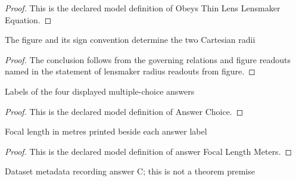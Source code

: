 \begin{proof}
  This is the declared model definition of Obeys Thin Lens Lensmaker Equation.
\end{proof}
\begin{lemma}
  \label{lem:physics:phyx-mini-0133:phyxminiproblems-problemphyxmini0133-lensmaker-radius-readouts-from-figure}
  The figure and its sign convention determine the two Cartesian radii
\end{lemma}
\begin{proof}
  The conclusion follows from the governing relations and figure readouts named in the statement of lensmaker radius readouts from figure.
\end{proof}
\begin{definition}
  \label{def:physics:phyx-mini-0133:phyxminiproblems-problemphyxmini0133-answerchoice}
  Labels of the four displayed multiple-choice answers
\end{definition}
\begin{proof}
  This is the declared model definition of Answer Choice.
\end{proof}
\begin{definition}
  \label{def:physics:phyx-mini-0133:phyxminiproblems-problemphyxmini0133-answerfocallengthmeters}
  Focal length in metres printed beside each answer label
\end{definition}
\begin{proof}
  This is the declared model definition of answer Focal Length Meters.
\end{proof}
\begin{definition}
  \label{def:physics:phyx-mini-0133:phyxminiproblems-problemphyxmini0133-recordedanswerchoice}
  Dataset metadata recording answer C; this is not a theorem premise
\end{definition}

